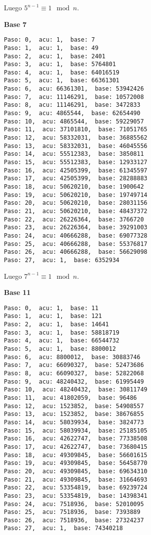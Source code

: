 \documentclass[a4paper]{article}
\begin{document}
Luego $5^{n-1}\equiv 1 \mod n$.


\textbf{Base 7}
\begin{verbatim}
Paso: 0,  acu: 1,  base: 7  
Paso: 1,  acu: 1,  base: 49  
Paso: 2,  acu: 1,  base: 2401  
Paso: 3,  acu: 1,  base: 5764801  
Paso: 4,  acu: 1,  base: 64016519  
Paso: 5,  acu: 1,  base: 66361301  
Paso: 6,  acu: 66361301,  base: 53942426  
Paso: 7,  acu: 11146291,  base: 10572008  
Paso: 8,  acu: 11146291,  base: 3472833  
Paso: 9,  acu: 4865544,  base: 62654490  
Paso: 10,  acu: 4865544,  base: 59229057  
Paso: 11,  acu: 37101810,  base: 71051765  
Paso: 12,  acu: 58332031,  base: 36885562  
Paso: 13,  acu: 58332031,  base: 46045556  
Paso: 14,  acu: 55512383,  base: 3850811  
Paso: 15,  acu: 55512383,  base: 12933127  
Paso: 16,  acu: 42505399,  base: 61345597  
Paso: 17,  acu: 42505399,  base: 28288883  
Paso: 18,  acu: 50620210,  base: 1900642  
Paso: 19,  acu: 50620210,  base: 19749714  
Paso: 20,  acu: 50620210,  base: 28031156  
Paso: 21,  acu: 50620210,  base: 48437372  
Paso: 22,  acu: 26226364,  base: 3766720  
Paso: 23,  acu: 26226364,  base: 39291003  
Paso: 24,  acu: 40666288,  base: 69077328  
Paso: 25,  acu: 40666288,  base: 55376817  
Paso: 26,  acu: 40666288,  base: 56629098  
Paso: 27,  acu: 1,  base: 6352934  
\end{verbatim}

Luego $7^{n-1}\equiv 1 \mod n$.


\textbf{Base 11}
\begin{verbatim}
Paso: 0,  acu: 1,  base: 11  
Paso: 1,  acu: 1,  base: 121  
Paso: 2,  acu: 1,  base: 14641  
Paso: 3,  acu: 1,  base: 58818719  
Paso: 4,  acu: 1,  base: 66544732  
Paso: 5,  acu: 1,  base: 8800012  
Paso: 6,  acu: 8800012,  base: 30883746  
Paso: 7,  acu: 66090327,  base: 52473686  
Paso: 8,  acu: 66090327,  base: 52822068  
Paso: 9,  acu: 48240432,  base: 61995449  
Paso: 10,  acu: 48240432,  base: 30811749  
Paso: 11,  acu: 41802059,  base: 96486  
Paso: 12,  acu: 1523852,  base: 54908557  
Paso: 13,  acu: 1523852,  base: 38676855  
Paso: 14,  acu: 58039934,  base: 3824773  
Paso: 15,  acu: 58039934,  base: 25185105  
Paso: 16,  acu: 42622747,  base: 77338508  
Paso: 17,  acu: 42622747,  base: 73680415  
Paso: 18,  acu: 49309845,  base: 56601615  
Paso: 19,  acu: 49309845,  base: 56458770  
Paso: 20,  acu: 49309845,  base: 69634310  
Paso: 21,  acu: 49309845,  base: 31664693  
Paso: 22,  acu: 53354819,  base: 69239724  
Paso: 23,  acu: 53354819,  base: 14398341  
Paso: 24,  acu: 7518936,  base: 52010095  
Paso: 25,  acu: 7518936,  base: 7393889  
Paso: 26,  acu: 7518936,  base: 27324237  
Paso: 27,  acu: 1,  base: 74340218  
\end{verbatim}
\end{document}
